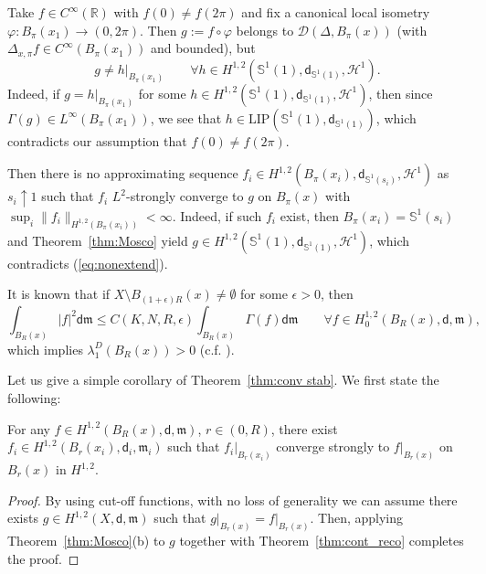 \documentclass[a4paper,11pt,reqno]{article}
\numberwithin{equation}{section}
\theoremstyle{plain}
\theoremstyle{definition}
\theoremstyle{remark}
\let\altphi\phi
\let\phi\varphi
\let\varphi\altphi
\let\altphi\undefined
\newcommand{\dist}{\mathsf{d}}
\newcommand{\meas}{\mathfrak{m}}
\begin{document}
{\begin{remark}
Take $f \in C^{\infty}(\mathbb{R})$ with $f(0) \neq f(2\pi)$ and fix a canonical local isometry $\phi: B_{\pi}(x_1) \to (0, 2\pi)$.
Then $g:=f\circ\phi$ belongs to $\mathcal{D}(\Delta, B_{\pi}(x))$ (with $\Delta_{x,\pi} f \in C^{\infty}(B_{\pi}(x_1))$ and bounded), but 
\begin{equation}\label{eq:nonextend}
g \neq h\vert_{B_{\pi}(x_1)}\qquad\forall h \in H^{1, 2}(\mathbb{S}^1(1), \dist_{\mathbb{S}^1(1)}, \mathcal{H}^1).
\end{equation}
Indeed, if $g=h\vert_{B_{\pi}(x_1)}$ for some $h \in H^{1, 2}(\mathbb{S}^1(1), \dist_{\mathbb{S}^1(1)}, \mathcal{H}^1)$, then since 
$\Gamma(g)\in L^{\infty}(B_{\pi}(x_1))$, we see that $h \in \mathrm{LIP}(\mathbb{S}^1(1), \dist_{\mathbb{S}^1(1)})$, which contradicts 
our assumption that $f(0) \neq f(2\pi)$.

Then there is no approximating sequence $f_i \in H^{1, 2}(B_{\pi}(x_i), \dist_{\mathbb{S}^1(s_i)}, \mathcal{H}^1)$ as $s_i \uparrow 1$ such that $f_i$ $L^2$-strongly converge to $g$ on $B_{\pi}(x)$ with $\sup_i\|f_i\|_{H^{1, 2}(B_{\pi}(x_i))}<\infty$.
Indeed, if such $f_i$ exist, then $B_{\pi}(x_i)=\mathbb{S}^1(s_i)$ and Theorem~\ref{thm:Mosco} yield 
$g \in H^{1, 2}(\mathbb{S}^1(1), \dist_{\mathbb{S}^1(1)}, \mathcal{H}^1)$, which contradicts (\ref{eq:nonextend}). 
\end{remark}

It is known that if $X \setminus B_{(1+\epsilon)R}(x) \neq \emptyset$ for some $\epsilon>0$, then
\begin{equation}\label{eq:00}
\int_{B_R(x)}|f|^2 \dist \meas \le C(K, N, R, \epsilon) \int_{B_R(x)}\Gamma(f)\dist \meas\qquad \forall f \in H^{1, 2}_0(B_R(x), \dist, \meas),
\end{equation}
which implies $\lambda_1^D(B_R(x))>0$ (c.f. \cite[(4.5)]{Cheeger}).

Let us give a simple corollary of Theorem~\ref{thm:conv stab}.
We first state the following:
\begin{lemma}\label{lem:app}
For any $f \in H^{1, 2}(B_R(x), \dist, \meas)$, $r\in (0,R)$, there exist 
$f_i \in H^{1, 2}(B_r(x_i), \dist_i, \meas_i) $ such that $f_i\vert_{B_r(x_i)}$ converge strongly to $f\vert_{B_r(x)}$ on $B_r(x)$ in $H^{1, 2}$.
\end{lemma}
\begin{proof} By using cut-off functions, with no loss of generality we can assume there exists $g \in H^{1, 2}(X, \dist, \meas)$ such that 
$g\vert_{B_r(x)} = f\vert_{B_r(x)}$.
Then, applying Theorem~\ref{thm:Mosco}(b) to $g$ together with Theorem~\ref{thm:cont_reco} completes 
the proof.
\end{proof}

}
\end{document}
